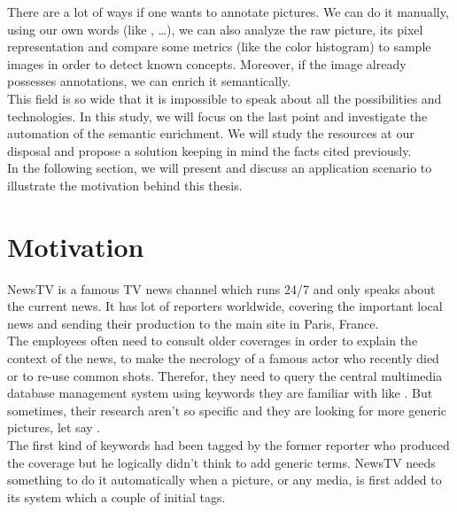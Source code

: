 There are a lot of ways if one wants to annotate pictures. We can do it manually, using our own words (like ,  \dots), we can also analyze the raw picture, its pixel representation and compare some metrics (like the color histogram) to sample images in order to detect known concepts. Moreover, if the image already possesses annotations, we can enrich it semantically. \\

This field is so wide that it is impossible to speak about all the possibilities and technologies. In this study, we will focus on the last point and investigate the automation of the semantic enrichment. We will study the resources at our disposal and propose a solution keeping in mind the facts cited previously.\\

In the following section, we will present and discuss an application scenario to illustrate the motivation behind this thesis. 


\section{Motivation}

NewsTV is a famous TV news channel which runs 24/7 and only speaks about the current news. It has lot of reporters worldwide, covering the important local news and sending their production to the main site in Paris, France.\\

The employees often need to consult older coverages in order to explain the context of the news, to make the necrology of a famous actor who recently died or to re-use common shots. Therefor, they need to query the central multimedia database management system using keywords they are familiar with like . But sometimes, their research aren't so specific and they are looking for more generic pictures, let say .\\

The first kind of keywords had been tagged by the former reporter who produced the coverage but he logically didn't think to add generic terms. NewsTV needs something to do it automatically when a picture, or any media, is first added to its system which a couple of initial tags.\\

